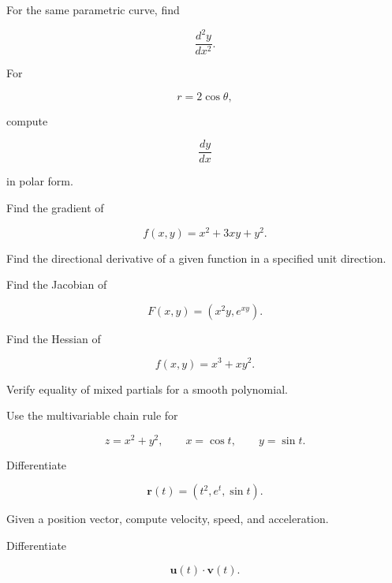 \begin{exercise}[3]
For the same parametric curve, find

\[
\frac{d^2y}{dx^2}.
\]
\end{exercise}

\begin{exercise}[3]
For

\[
r=2\cos\theta,
\]

compute

\[
\frac{dy}{dx}
\]

in polar form.
\end{exercise}

\begin{exercise}[2]
Find the gradient of

\[
f(x,y)=x^2+3xy+y^2.
\]
\end{exercise}

\begin{exercise}[2]
Find the directional derivative of a given function in a specified unit
direction.
\end{exercise}

\begin{exercise}[2]
Find the Jacobian of

\[
F(x,y)
=
(x^2y,e^{xy}).
\]
\end{exercise}

\begin{exercise}[2]
Find the Hessian of

\[
f(x,y)
=
x^3+xy^2.
\]
\end{exercise}

\begin{exercise}[3]
Verify equality of mixed partials for a smooth polynomial.
\end{exercise}

\begin{exercise}[3]
Use the multivariable chain rule for

\[
z=x^2+y^2,
\qquad
x=\cos t,
\qquad
y=\sin t.
\]
\end{exercise}

\begin{exercise}[3]
Differentiate

\[
\mathbf{r}(t)
=
(t^2,e^t,\sin t).
\]
\end{exercise}

\begin{exercise}[3]
Given a position vector, compute velocity, speed, and acceleration.
\end{exercise}

\begin{exercise}[3]
Differentiate

\[
\mathbf{u}(t)\cdot\mathbf{v}(t).
\]
\end{exercise}

